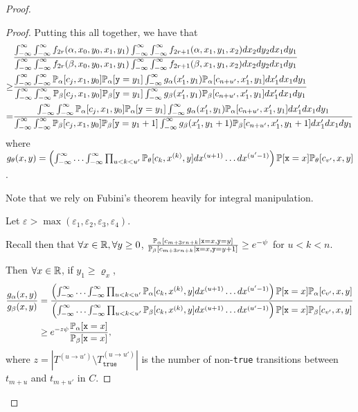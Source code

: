 \begin{proof}
\begin{proof}
		Putting this all together, we have that \begin{align*}
			&\frac{\int_{-\infty}^\infty \int_{-\infty}^\infty f_{2r}(\alpha, x_0, y_0, x_1, y_1)\int_{-\infty}^\infty \int_{-\infty}^\infty f_{2r+1}(\alpha,x_1, y_1, x_2) dx_{2}dy_{2} dx_{1}dy_{1}}
			{\int_{-\infty}^\infty \int_{-\infty}^\infty f_{2r}(\beta, x_0, y_0, x_1, y_1)\int_{-\infty}^\infty \int_{-\infty}^\infty f_{2r+1}(\beta,x_1, y_1, x_2) dx_{2}dy_{2} dx_{1}dy_{1}}\\
			\geq& \frac{\int_{-\infty}^\infty\int_{-\infty}^{\infty}\mathbb{P}_\alpha[c_{j}, x_1, y_0]\mathbb{P}_\alpha[\texttt{y}=y_1]\int_{-\infty}^\infty g_\alpha(x_1', y_1)\mathbb{P}_\alpha[c_{n+u'}, x_1', y_1] dx_1' dx_1dy_1}{\int_{-\infty}^\infty\int_{-\infty}^{\infty}\mathbb{P}_\beta[c_{j}, x_1, y_0]\mathbb{P}_\beta[\texttt{y}=y_1]\int_{-\infty}^\infty g_\beta(x_1', y_1)\mathbb{P}_\beta[c_{n+u'}, x_1', y_1] dx_1' dx_1dy_1}\\
			=& \frac{\int_{-\infty}^\infty\int_{-\infty}^{\infty}\mathbb{P}_\alpha[c_{j}, x_1, y_0]\mathbb{P}_\alpha[\texttt{y}=y_1]\int_{-\infty}^\infty g_\alpha(x_1', y_1)\mathbb{P}_\alpha[c_{n+u'}, x_1', y_1] dx_1' dx_1dy_1}{\int_{-\infty}^\infty\int_{-\infty}^{\infty}\mathbb{P}_\beta[c_{j}, x_1, y_0]\mathbb{P}_\beta[\texttt{y}=y_1+1]\int_{-\infty}^\infty g_\beta(x_1', y_1+1)\mathbb{P}_\beta[c_{n+u'}, x_1', y_1+1] dx_1' dx_1dy_1}
		\end{align*} where $g_\theta(x, y) = \left(\int_{-\infty}^\infty\ldots\int_{-\infty}^\infty\prod_{u<k<u'}\mathbb{P}_\theta[c_{k}, x^{(k)}, y] dx^{(u+1)}\ldots dx^{(u'-1)}\right)\mathbb{P}[\texttt{x}=x]\mathbb{P}_\theta[c_{v'}, x, y]$.
		
		Note that we rely on Fubini's theorem heavily for integral manipulation. 

		
		Let $\varepsilon>\max(\varepsilon_1, \varepsilon_2, \varepsilon_3, \varepsilon_4)$. 

		Recall then that $\forall x\in \mathbb{R}, \forall y\geq 0$, $\frac{\mathbb{P}_\alpha[c_{m+3rn+k}|\texttt{x}=x, \texttt{y}=y]}{\mathbb{P}_\beta[c_{m+3rn+k}|\texttt{x}=x, \texttt{y}=y+1]}\geq e^{-\psi}$ for $u<k<n$. 
		
		Then $\forall x\in \mathbb{R}$, if $y_1\geq \varrho_x$, \begin{align*}
			\frac{g_\alpha(x, y)}{g_\beta(x, y)}&=\frac{\left(\int_{-\infty}^\infty\ldots\int_{-\infty}^\infty\prod_{u<k<u'}\mathbb{P}_\alpha[c_{k}, x^{(k)}, y] dx^{(u+1)}\ldots dx^{(u'-1)}\right)\mathbb{P}[\texttt{x}=x]\mathbb{P}_\alpha[c_{v'}, x, y]}{\left(\int_{-\infty}^\infty\ldots\int_{-\infty}^\infty\prod_{u<k<u'}\mathbb{P}_\beta[c_{k}, x^{(k)}, y] dx^{(u+1)}\ldots dx^{(u'-1)}\right)\mathbb{P}[\texttt{x}=x]\mathbb{P}_\beta[c_{v'}, x, y]}\\
			&\geq e^{-z\psi}\frac{\mathbb{P}_\alpha[\texttt{x}=x]}{\mathbb{P}_\beta[\texttt{x}=x]},
		\end{align*} where $z = |T^{(u\to u')}\setminus T^{(u\to u')}_\texttt{true} |$ is the number of non-\texttt{true} transitions between $t_{m+u}$ and $t_{m+u'}$ in $C$. 


\end{proof}
\end{proof}
